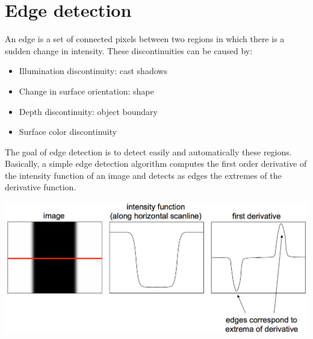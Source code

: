 \section{Edge detection}
An edge is a set of connected pixels between two regions in which there is a sudden change in intensity. These discontinuities can be caused by:
\begin{itemize}
    \item Illumination discontinuity: cast shadows
    \item Change in surface orientation: shape
    \item Depth discontinuity: object boundary
    \item Surface color discontinuity
\end{itemize}
The goal of edge detection is to detect easily and automatically these regions.\newline
Basically, a simple edge detection algorithm computes the first order derivative of the intensity function of an image and detects as edges the extremes of the derivative function.
\begin{flushleft}
    \includegraphics[scale = 0.4]{images/edge detection.png}
\end{flushleft}


